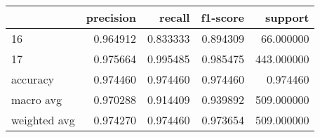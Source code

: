 \begin{tabular}{lrrrr}
\toprule
 & precision & recall & f1-score & support \\
\midrule
16 & 0.964912 & 0.833333 & 0.894309 & 66.000000 \\
17 & 0.975664 & 0.995485 & 0.985475 & 443.000000 \\
accuracy & 0.974460 & 0.974460 & 0.974460 & 0.974460 \\
macro avg & 0.970288 & 0.914409 & 0.939892 & 509.000000 \\
weighted avg & 0.974270 & 0.974460 & 0.973654 & 509.000000 \\
\bottomrule
\end{tabular}

